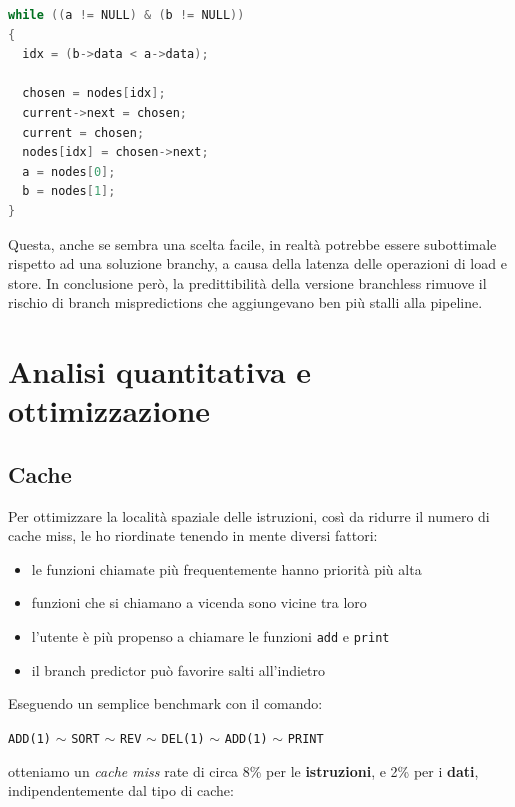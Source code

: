 \documentclass[a4paper,12pt]{article}
\begin{document}
\begin{lstlisting}[language=C]
while ((a != NULL) & (b != NULL))
{
  idx = (b->data < a->data);

  chosen = nodes[idx];
  current->next = chosen;
  current = chosen;
  nodes[idx] = chosen->next;
  a = nodes[0];
  b = nodes[1];
}
\end{lstlisting}

Questa, anche se sembra una scelta facile, in realtà potrebbe essere subottimale rispetto ad una soluzione branchy, a causa della latenza delle operazioni di load e store. In conclusione però, la predittibilità della versione branchless rimuove il rischio di branch mispredictions che aggiungevano ben più stalli alla pipeline.

\section{Analisi quantitativa e ottimizzazione}

\subsection{Cache}

Per ottimizzare la località spaziale delle istruzioni, così da ridurre il numero di cache miss, le ho riordinate tenendo in mente diversi fattori:

\begin{itemize}
    \item le funzioni chiamate più frequentemente hanno priorità più alta
    \item funzioni che si chiamano a vicenda sono vicine tra loro
    \item l'utente è più propenso a chiamare le funzioni \texttt{add} e \texttt{print}
    \item il branch predictor può favorire salti all'indietro
\end{itemize}

Eseguendo un semplice benchmark con il comando:

\begin{center}
\texttt{ADD(1)} $\sim$ \texttt{SORT} $\sim$ \texttt{REV} $\sim$ \texttt{DEL(1)} $\sim$ \texttt{ADD(1)} $\sim$ \texttt{PRINT}
\end{center}

otteniamo un \emph{cache miss} rate di circa 8\% per le \textbf{istruzioni}, e 2\% per i \textbf{dati}, indipendentemente dal tipo di cache:
\end{document}
